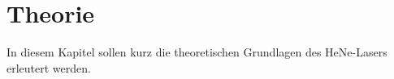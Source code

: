 \section{Theorie}
\label{sec:Theorie}
In diesem Kapitel sollen kurz die theoretischen Grundlagen des HeNe-Lasers erleutert werden.

